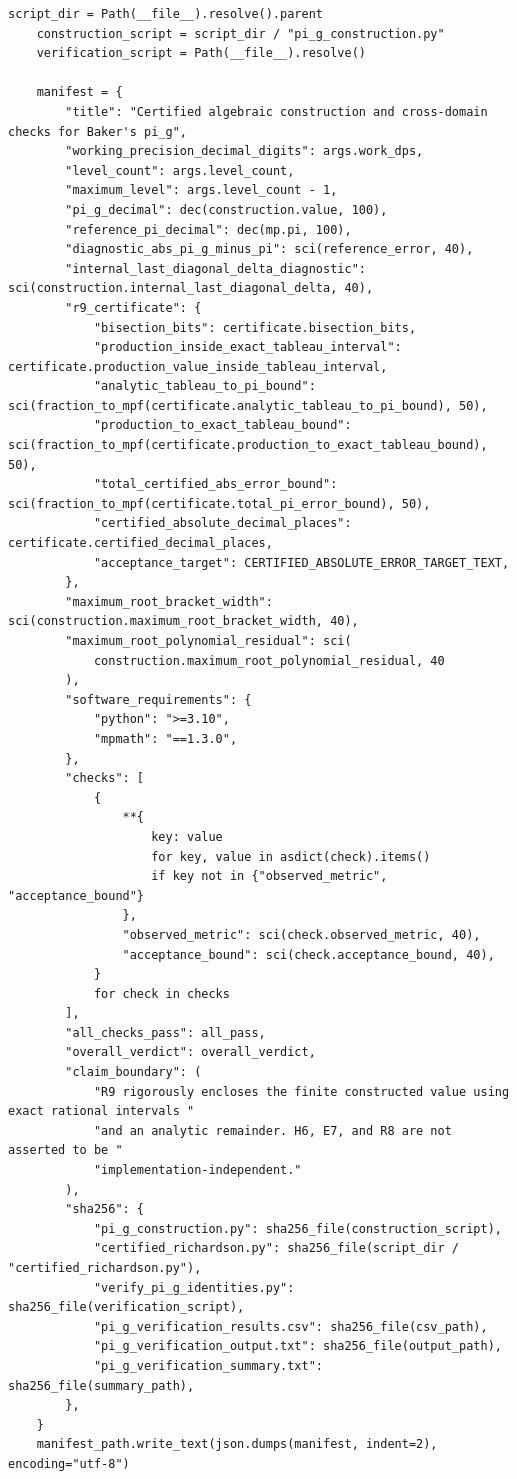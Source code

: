\documentclass[11pt]{article}
\begin{document}
\begin{lstlisting}[style=pythonstyle,caption={Verification driver: \texttt{verify\_pi\_g\_identities.py}}]
    script_dir = Path(__file__).resolve().parent
    construction_script = script_dir / "pi_g_construction.py"
    verification_script = Path(__file__).resolve()

    manifest = {
        "title": "Certified algebraic construction and cross-domain checks for Baker's pi_g",
        "working_precision_decimal_digits": args.work_dps,
        "level_count": args.level_count,
        "maximum_level": args.level_count - 1,
        "pi_g_decimal": dec(construction.value, 100),
        "reference_pi_decimal": dec(mp.pi, 100),
        "diagnostic_abs_pi_g_minus_pi": sci(reference_error, 40),
        "internal_last_diagonal_delta_diagnostic": sci(construction.internal_last_diagonal_delta, 40),
        "r9_certificate": {
            "bisection_bits": certificate.bisection_bits,
            "production_inside_exact_tableau_interval": certificate.production_value_inside_tableau_interval,
            "analytic_tableau_to_pi_bound": sci(fraction_to_mpf(certificate.analytic_tableau_to_pi_bound), 50),
            "production_to_exact_tableau_bound": sci(fraction_to_mpf(certificate.production_to_exact_tableau_bound), 50),
            "total_certified_abs_error_bound": sci(fraction_to_mpf(certificate.total_pi_error_bound), 50),
            "certified_absolute_decimal_places": certificate.certified_decimal_places,
            "acceptance_target": CERTIFIED_ABSOLUTE_ERROR_TARGET_TEXT,
        },
        "maximum_root_bracket_width": sci(construction.maximum_root_bracket_width, 40),
        "maximum_root_polynomial_residual": sci(
            construction.maximum_root_polynomial_residual, 40
        ),
        "software_requirements": {
            "python": ">=3.10",
            "mpmath": "==1.3.0",
        },
        "checks": [
            {
                **{
                    key: value
                    for key, value in asdict(check).items()
                    if key not in {"observed_metric", "acceptance_bound"}
                },
                "observed_metric": sci(check.observed_metric, 40),
                "acceptance_bound": sci(check.acceptance_bound, 40),
            }
            for check in checks
        ],
        "all_checks_pass": all_pass,
        "overall_verdict": overall_verdict,
        "claim_boundary": (
            "R9 rigorously encloses the finite constructed value using exact rational intervals "
            "and an analytic remainder. H6, E7, and R8 are not asserted to be "
            "implementation-independent."
        ),
        "sha256": {
            "pi_g_construction.py": sha256_file(construction_script),
            "certified_richardson.py": sha256_file(script_dir / "certified_richardson.py"),
            "verify_pi_g_identities.py": sha256_file(verification_script),
            "pi_g_verification_results.csv": sha256_file(csv_path),
            "pi_g_verification_output.txt": sha256_file(output_path),
            "pi_g_verification_summary.txt": sha256_file(summary_path),
        },
    }
    manifest_path.write_text(json.dumps(manifest, indent=2), encoding="utf-8")


\end{lstlisting}
\end{document}
